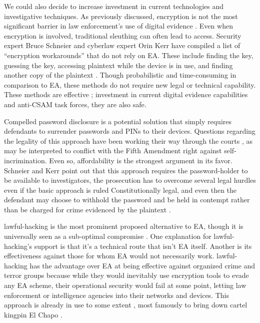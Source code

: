 We could also decide to increase investment in current technologies and investigative techniques. As previously
discussed, encryption is not the most significant barrier in law enforcement's use of digital evidence
\cite{carter_2018}. Even when encryption is involved, traditional sleuthing can often lead to access. Security expert
Bruce Schneier and cyberlaw expert Orin Kerr have compiled a list of ``encryption workarounds'' that do not rely on
\ac{EA}. These include finding the key, guessing the key, accessing plaintext while the device is in use, and finding
another copy of the plaintext \cite{kerr_encryption_2017}. Though probabilistic and time-consuming in comparison to
\ac{EA}, these methods do not require new legal or technical capability. These methods are effective
\cite{greenberg_2018}; investment in current digital evidence capabilities and anti-\ac{CSAM} task forces, they are also
safe.

Compelled password disclosure is a potential solution that simply requires defendants to surrender passwords and
\acp{PIN} to their devices. Questions regarding the legality of this approach have been working their way through the
courts \cite{bittenbender_2019} \cite{sobel_2019}, as may be interpreted to conflict with the Fifth Amendment right
against self-incrimination. Even so, affordability is the strongest argument in its favor. Schneier and Kerr point out
that this approach requires the password-holder to be available to investigators, the prosecution has to overcome
several legal hurdles even if the basic approach is ruled Constitutionally legal, and even then the defendant may choose
to withhold the password and be held in contempt rather than be charged for crime evidenced by the plaintext
\cite{kerr_encryption_2017}.

\Ac{lawful-hacking} is the most prominent proposed alternative to \ac{EA}, though it is universally seen as a
sub-optimal compromise \cite{bellovin_lawful_2013} \cite{hennessey_lawful_2016} \cite{rozenshtein_wicked_2018}
\cite{kerr_encryption_2017} \cite{soesanto_2018}. One explanation for \ac{lawful-hacking}'s support is that it's a
technical route that isn't \ac{EA} itself. Another is its effectiveness against those for whom \ac{EA} would not
necessarily work. \Ac{lawful-hacking} has the advantage over \ac{EA} at being effective against organized crime and
terror groups because while they would inevitably use encryption tools to evade any \ac{EA} scheme, their operational
security would fail at some point, letting law enforcement or intelligence agencies into their networks and devices.
This approach is already in use to some extent \cite{cox_2020}, most famously to bring down cartel kingpin El Chapo
\cite{feuer_chapo_2019}.

